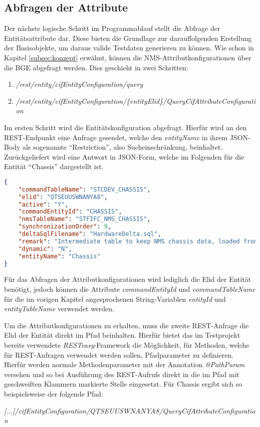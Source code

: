 \subsection{Abfragen der Attribute}\label{subsec:attributes}
Der nächste logische Schritt im Programmablauf stellt die Abfrage der Entitätsattribute dar. Diese bieten die Grundlage zur darauffolgenden Erstellung der Basisobjekte, um daraus valide Testdaten generieren zu können. Wie schon in Kapitel \ref{subsec:konzept} erwähnt, können die \ac{NMS}-Attributkonfigurationen über die \ac{BGE} abgefragt werden. Dies geschieht in zwei Schritten:

\begin{enumerate}
    \item \textit{/rest/entity/cifEntityConfiguration/query}
    \item \textit{/rest/entity/cifEntityConfiguration/\{entityElid\}/QueryCifAttributeConfiguration}
\end{enumerate}

Im ersten Schritt wird die Entitätskonfiguration abgefragt. Hierfür wird an den \ac{REST}-Endpunkt eine Anfrage gesendet, welche den \textit{entityName} in ihrem \ac{JSON}-Body als sogenannte \enquote{Restriction}, also Sucheinschränkung, beinhaltet. Zurückgeliefert wird eine Antwort in \ac{JSON}-Form, welche im Folgenden für die Entität \enquote{Chassis} dargestellt ist.

\begin{lstlisting}[caption=Entitätskonfiguration des Chassis in JSON-Form, label=entityConfigResponse,language=json]
{
    "commandTableName": "STCDEV_CHASSIS",
    "elid": "QTSEUUSWNANYA8",
    "active": "Y",
    "commandEntityId": "CHASSIS",
    "nmsTableName": "STFIFC_NMS_CHASSIS",
    "synchronizationOrder": 9,
    "deltaSqlFilename": "HardwareDelta.sql",
    "remark": "Intermediate table to keep NMS chassis data, loaded from external system",
    "dynamic": "N",
    "entityName": "Chassis"
}
\end{lstlisting}

Für das Abfragen der Attributkonfigurationen wird lediglich die \ac{Elid} der Entität benötigt, jedoch können die Attribute \textit{commandEntityId} und \textit{commandTableName} für die im vorigen Kapitel angesprochenen String-Variablen \textit{entityId} und \textit{entityTableName} verwendet werden.

Um die Attributkonfigurationen zu erhalten, muss die zweite \ac{REST}-Anfrage die \ac{Elid} der Entität direkt im Pfad beinhalten. Hierfür bietet das im Testprojekt bereits verwendete \textit{RESTeasy}-Framework die Möglichkeit, für Methoden, welche für \ac{REST}-Anfragen verwendet werden sollen, Pfadparameter zu definieren. Hierfür werden normale Methodenparameter mit der Annotation \textit{@PathParam} versehen und so bei Ausführung des \ac{REST}-Aufrufs direkt in die im Pfad mit geschweiften Klammern markierte Stelle eingesetzt. Für Chassis ergibt sich so beispielsweise der folgende Pfad: 
\begin{center}
    \textit{[...]/cifEntityConfiguration/QTSEUUSWNANYA8/QueryCifAttributeConfiguration}
\end{center}

